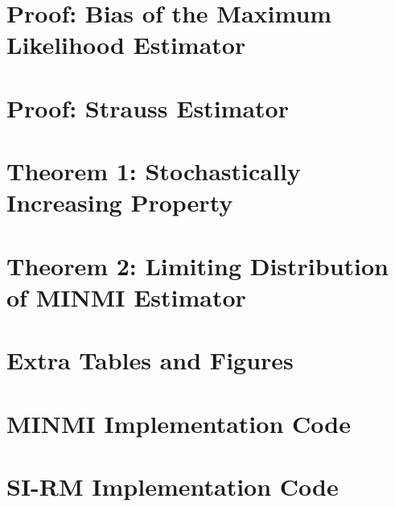 \documentclass[honours,12pt]{UNSWthesis}
\begin{document}


\appendix

\chapter{Proof: Bias of the Maximum Likelihood Estimator}\label{apx:mle-bias-proof}


\chapter{Proof: Strauss Estimator}\label{apx:strauss-estimator-proof}


\chapter{Theorem 1: Stochastically Increasing Property}\label{apx:minmi-stoch-incr-proof}


\chapter{Theorem 2: Limiting Distribution of MINMI Estimator}\label{apx:minmi-asymptotics-proof}


\chapter{Extra Tables and Figures}\label{apx:extra-tables-figures}


\chapter{MINMI Implementation Code}\label{apx:code-minmi}


\chapter{SI-RM Implementation Code}\label{apx:code-si-rm}

\end{document}
